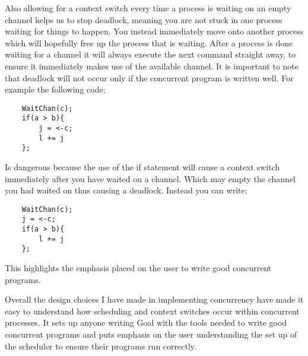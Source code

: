 Also allowing for a context switch every time a process is waiting on an empty channel helps us to stop deadlock, meaning you are not stuck in one process waiting for things to happen. You instead immediately move onto another process which will hopefully free up the process that is waiting. After a process is done waiting for a channel it will always execute the next command straight away, to ensure it immediately makes use of the available channel.  It is important to note that deadlock will not occur only if the concurrent program is written well. For example the following code;

\newpage

\begin{lstlisting}
	WaitChan(c);
	if(a > b){
		j = <-c;
		l += j
	};
\end{lstlisting}     

Is dangerous because the use of the if statement will cause a context switch immediately after you have waited on a channel. Which may empty the channel you had waited on thus causing a deadlock. Instead you can write;

\begin{lstlisting}
	WaitChan(c);
	j = <-c;
	if(a > b){	
		l += j
	};
\end{lstlisting}

This highlights the emphasis placed on the user to write good concurrent programs. 

Overall the design choices I have made in implementing concurrency have made it easy to understand how scheduling and context switches occur within concurrent processes. It sets up anyone writing Goal with the tools needed to write good concurrent programs and puts emphasis on the user understanding the set up of the scheduler to ensure their programs run correctly.  
 
